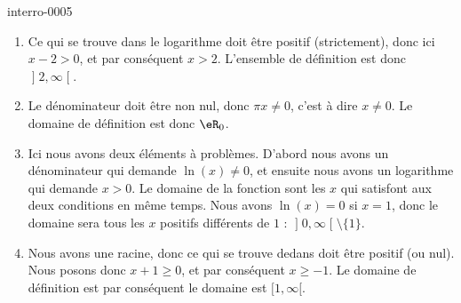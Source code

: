 
\begin{corrige}{interro-0005}

    \begin{enumerate}
        \item
            Ce qui se trouve dans le logarithme doit être positif (strictement), donc ici $x-2>0$, et par conséquent $x>2$. L'ensemble de définition est donc $\mathopen] 2 , \infty \mathclose[$.
        \item
            Le dénominateur doit être non nul, donc $\pi x\neq 0$, c'est à dire $x\neq 0$. Le domaine de définition est donc $\eR_0$.
        \item
            Ici nous avons deux éléments à problèmes. D'abord nous avons un dénominateur qui demande $\ln(x)\neq 0$, et ensuite nous avons un logarithme qui demande $x>0$. Le domaine de la fonction sont les $x$ qui satisfont aux deux conditions en même temps. Nous avons $\ln(x)=0$ si $x=1$, donc le domaine sera tous les $x$ positifs différents de $1$ : $\mathopen] 0 , \infty \mathclose[\setminus\{ 1 \}$.
        \item
            Nous avons une racine, donc ce qui se trouve dedans doit être positif (ou nul). Nous posons donc $x+1\geq 0$, et par conséquent $x\geq -1$. Le domaine de définition est par conséquent le domaine est \( \mathopen[ 1 , \infty [\).
    \end{enumerate}

\end{corrige}
